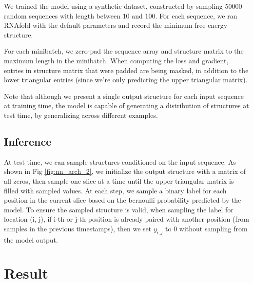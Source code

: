 \documentclass{article}
\begin{document}
We trained the model using a synthetic dataset, constructed by sampling $50000$ random sequences with length
between $10$ and $100$.
For each sequence, we ran RNAfold\cite{lorenz2011viennarna} with the default parameters and
record the minimum free energy structure.

For each minibatch, we zero-pad the sequence array and structure matrix to the maximum length in the minibatch.
When computing the loss and gradient, entries in structure matrix that were padded are being masked,
in addition to the lower triangular entries (since we're only predicting the upper triangular matrix).

Note that although we present a single output structure for each input sequence at training time,
the model is capable of generating a distribution of structures at test time, by generalizing across different examples.






\subsection{Inference}

At test time, we can sample structures conditioned on the input sequence.
As shown in Fig \ref{fig:nn_arch_2}, we initialize the output structure with a matrix of all zeros,
then sample one slice at a time until the upper triangular matrix is filled with sampled values.
At each step, we sample a binary label for each position in the current slice based on the
bernoulli probability predicted by the model.
To ensure the sampled structure is valid, when sampling the label for location (i, j),
if i-th or j-th position is already paired with another position (from samples in the previous timestamps),
then we set $y_{i, j}$ to $0$ without sampling from the model output.

\section{Result}

\end{document}
